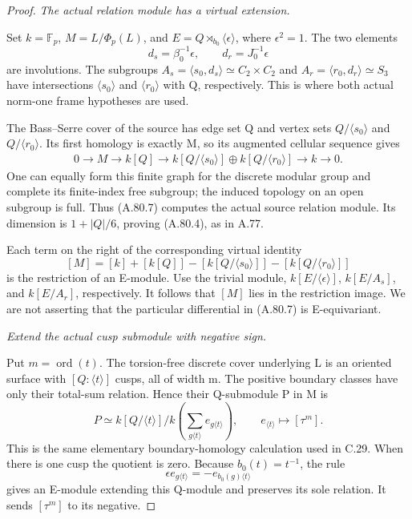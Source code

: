 \begin{proof}
\emph{The actual relation module has a virtual extension.}\par
Set \(k=\mathbb F_p\), \(M=L/\Phi_p(L)\), and
\(E=Q\rtimes_{b_0}\langle\epsilon\rangle\), where
\(\epsilon^2=1\). The two elements
\[
                 d_s=\beta_0^{-1}\epsilon,
                 \qquad d_r=J_0^{-1}\epsilon
 \tag{A.80.6}
\]
are involutions. The subgroups
\(A_s=\langle s_0,d_s\rangle\simeq C_2\times C_2\)
and \(A_r=\langle r_0,d_r\rangle\simeq S_3\) have
intersections \(\langle s_0\rangle\) and
\(\langle r_0\rangle\) with Q, respectively. This is
where both actual norm-one frame hypotheses are used.

The Bass--Serre cover of the source has edge set Q and vertex
sets \(Q/\langle s_0\rangle\) and
\(Q/\langle r_0\rangle\). Its first homology is exactly M,
so its augmented cellular sequence gives
\[
 \begin{split}
 0\longrightarrow M\longrightarrow k[Q]\longrightarrow
 k[Q/\langle s_0\rangle]\oplus k[Q/\langle r_0\rangle]
 \longrightarrow k\longrightarrow0.
 \end{split}
 \tag{A.80.7}
\]
One can equally form this finite graph for the discrete modular
group and complete its finite-index free subgroup; the induced
topology on an open subgroup is full. Thus (A.80.7) computes
the actual source relation module. Its dimension is
\(1+|Q|/6\), proving (A.80.4), as in A.77.

Each term on the right of the corresponding virtual identity
\[
 [M]=[k]+[k[Q]]-[k[Q/\langle s_0\rangle]]
                   -[k[Q/\langle r_0\rangle]]
 \tag{A.80.8}
\]
is the restriction of an E-module. Use the trivial module,
\(k[E/\langle\epsilon\rangle]\), \(k[E/A_s]\), and
\(k[E/A_r]\), respectively. It follows that \([M]\) lies
in the restriction image. We are not asserting that the
particular differential in (A.80.7) is E-equivariant.

\emph{Extend the actual cusp submodule with negative sign.}\par
Put \(m=\operatorname{ord}(t)\). The torsion-free discrete
cover underlying L is an oriented surface with
\([Q:\langle t\rangle]\) cusps, all of width m. The
positive boundary classes have only their total-sum relation.
Hence their Q-submodule P in M is
\[
 P\simeq
 k[Q/\langle t\rangle]\big/
 k\!\left(\sum_{g\langle t\rangle}e_{g\langle t\rangle}\right),
 \qquad e_{\langle t\rangle}\longmapsto[\tau^m].
 \tag{A.80.9}
\]
This is the same elementary boundary-homology calculation used
in C.29. When there is one cusp the quotient is zero.
Because \(b_0(t)=t^{-1}\), the rule
\[
       \epsilon e_{g\langle t\rangle}
              =-e_{b_0(g)\langle t\rangle}
 \tag{A.80.10}
\]
gives an E-module extending this Q-module and preserves its
sole relation. It sends \([\tau^m]\) to its negative.


\end{proof}
